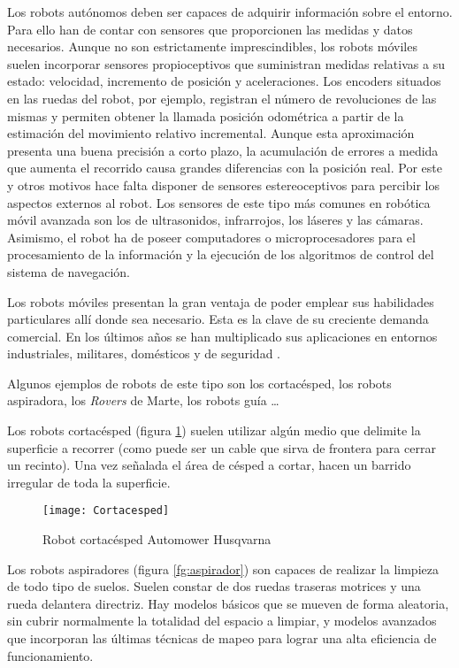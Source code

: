 Los robots autónomos deben ser capaces de adquirir información sobre el entorno. Para ello han de contar con sensores que proporcionen las medidas y datos necesarios. Aunque no son estrictamente imprescindibles, los robots móviles suelen incorporar sensores propioceptivos que suministran medidas relativas a su estado: velocidad, incremento de posición y aceleraciones. Los encoders situados en las ruedas del robot, por ejemplo, re\-gistran el número de revoluciones de las mismas y permiten obtener la llamada posición odométrica a partir de la estimación del movimiento relativo incremental. Aunque esta aproximación presenta una buena precisión a corto plazo, la acumulación de errores a medida que aumenta el recorrido causa grandes diferencias con la posición real. Por este y otros motivos hace falta disponer de sensores estereoceptivos para percibir los aspectos externos al robot. Los sensores de este tipo más comunes en robótica móvil avanzada son los de ultrasonidos, infrarrojos, los láseres y las cámaras.
Asimismo, el robot ha de poseer computadores o microprocesadores para el procesamiento de la información y la ejecución de los algoritmos de control del sistema de navegación.

Los robots móviles presentan la gran ventaja de poder emplear sus habilidades particulares allí donde sea necesario. Esta es la clave de su creciente demanda comercial. En los últimos años se han multiplicado sus aplicaciones en entornos industriales, militares, domésticos y de seguridad \cite{Arranz06}.

Algunos ejemplos de robots de este tipo son los cortacésped, los robots aspiradora, los \emph{Rovers} de Marte, los robots guía \ldots

Los robots cortacésped (figura \ref{fg:cortacesped}) suelen utilizar algún medio que delimite la superficie a recorrer (como puede ser un cable que sirva de frontera para cerrar un recinto). Una vez señalada el área de césped a cortar, hacen un barrido irregular de toda la superficie.

\begin{figure}[hbt]
  \centering\texttt{[image: Cortacesped]}\\
  \caption{Robot cortacésped Automower Husqvarna}\label{fg:cortacesped}
\end{figure}

Los robots aspiradores (figura \ref{fg:aspirador})  son capaces de realizar la limpieza de todo tipo de suelos. Suelen constar de dos ruedas traseras motrices y una rueda delantera directriz. Hay modelos básicos que se mueven de forma aleatoria, sin cubrir normalmente la totalidad del espacio a limpiar, y modelos avanzados que incorporan las últimas técnicas de mapeo para lograr una alta eficiencia de funcionamiento.

